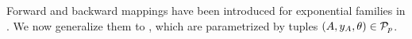 
Forward and backward mappings have been introduced for exponential families in .
We now generalize them to \HybridLogicNetworks{}, which are parametrized by tuples $(A,y_{A},\theta)\in\mathcal{P}_{p}$.

%
